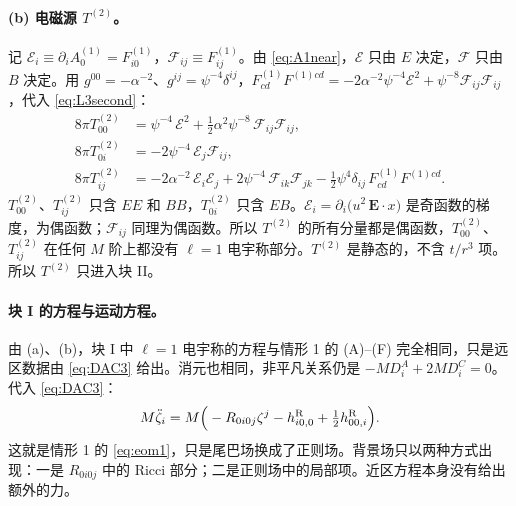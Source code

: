 \documentclass[11pt,a4paper]{ctexart}
\numberwithin{equation}{section}
\begin{document}
\paragraph{(b) 电磁源 $T^{(2)}$。}记 $\mathcal E_i\equiv\partial_iA^{(1)}_0=F^{(1)}_{i0}$，$\mathcal F_{ij}\equiv F^{(1)}_{ij}$。由 \eqref{eq:A1near}，$\mathcal E$ 只由 $E$ 决定，$\mathcal F$ 只由 $B$ 决定。用 $g^{00}=-\alpha^{-2}$、$g^{ij}=\psi^{-4}\delta^{ij}$，$F^{(1)}_{cd}F^{(1)cd}=-2\alpha^{-2}\psi^{-4}\mathcal E^2+\psi^{-8}\mathcal F_{ij}\mathcal F_{ij}$，代入 \eqref{eq:L3second}：
\begin{align}
8\pi T^{(2)}_{00}&=\psi^{-4}\,\mathcal E^2+\tfrac12\alpha^2\psi^{-8}\,\mathcal F_{ij}\mathcal F_{ij},\nonumber\\
8\pi T^{(2)}_{0i}&=-2\psi^{-4}\,\mathcal E_j\mathcal F_{ij},\label{eq:T2comp}\\
8\pi T^{(2)}_{ij}&=-2\alpha^{-2}\,\mathcal E_i\mathcal E_j+2\psi^{-4}\,\mathcal F_{ik}\mathcal F_{jk}-\tfrac12\psi^4\delta_{ij}\,F^{(1)}_{cd}F^{(1)cd}.\nonumber
\end{align}
$T^{(2)}_{00}$、$T^{(2)}_{ij}$ 只含 $EE$ 和 $BB$，$T^{(2)}_{0i}$ 只含 $EB$。$\mathcal E_i=\partial_i\big(u^2\,\boldsymbol E\!\cdot\!x\big)$ 是奇函数的梯度，为偶函数；$\mathcal F_{ij}$ 同理为偶函数。所以 $T^{(2)}$ 的所有分量都是偶函数，$T^{(2)}_{00}$、$T^{(2)}_{ij}$ 在任何 $M$ 阶上都没有 $\ell=1$ 电宇称部分。$T^{(2)}$ 是静态的，不含 $t/r^3$ 项。所以 $T^{(2)}$ 只进入块 II。

\paragraph{块 I 的方程与运动方程。}由 (a)、(b)，块 I 中 $\ell=1$ 电宇称的方程与情形 1 的 (A)--(F) 完全相同，只是远区数据由 \eqref{eq:DAC3} 给出。消元也相同，非平凡关系仍是 $-MD^A_i+2MD^C_i=0$。代入 \eqref{eq:DAC3}：
\begin{equation}
M\ddot\zeta_i=M\Big(-R_{0i0j}\zeta^j-h^{\rm R}_{i0,0}+\tfrac12h^{\rm R}_{00,i}\Big).
\label{eq:eom3}
\end{equation}
这就是情形 1 的 \eqref{eq:eom1}，只是尾巴场换成了正则场。背景场只以两种方式出现：一是 $R_{0i0j}$ 中的 Ricci 部分；二是正则场中的局部项。近区方程本身没有给出额外的力。
\end{document}
